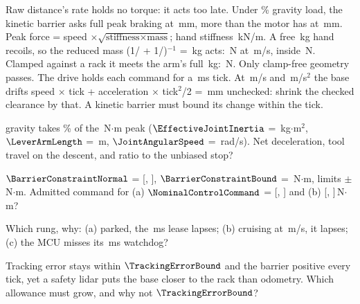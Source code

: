 \documentclass{studysheet}
\begin{document}
\begin{rightcol}
%
  {Raw distance's rate holds no torque: it acts too late. Under \% gravity load,
   the kinetic barrier asks full peak braking at \,mm, more than the motor has at \,mm.}{}
%
  {Peak force = speed $\times\sqrt{\text{stiffness}\times\text{mass}}$; hand stiffness \,kN/m. A free
   \,kg hand recoils, so the reduced mass (1/ + 1/)$^{-1}$ = \,kg acts: \,N at
   \,m/s, inside \,N. Clamped against a rack it meets the arm's full \,kg: \,N.
   Only clamp-free geometry passes.}{}
%
  {The drive holds each command for a \,ms tick. At \,m/s and \,m/s$^2$ the base drifts
   speed $\times$ tick + acceleration $\times$ tick$^2$/2 = \,mm unchecked: shrink the checked clearance by that.
   A kinetic barrier must bound its change within the tick.}{}

\vspace{2pt}
\begin{qs}
\item \assumed{} gravity takes \% of the \,N$\cdot$m peak ($\EffectiveJointInertia$ = \,kg$\cdot$m$^2$,
  $\LeverArmLength$ = \,m, $\JointAngularSpeed$ = \,rad/s). Net deceleration, tool travel on the descent,
  and ratio to the unbiased stop?
\item \assumed{} $\BarrierConstraintNormal$ = [, ], $\BarrierConstraintBound$ = \,N$\cdot$m, limits $\pm$\,N$\cdot$m. Admitted command
  for (a) $\NominalControlCommand$ = [, ] and (b) [, ]\,N$\cdot$m?
\item Which rung, why: (a) parked, the \,ms lease lapses; (b) cruising at
  \,m/s, it lapses; (c) the MCU misses its \,ms watchdog?
\item Tracking error stays within $\TrackingErrorBound$ and the barrier positive every tick, yet a safety
  lidar puts the base closer to the rack than odometry. Which allowance must grow, and why not $\TrackingErrorBound$?
\end{qs}
\end{rightcol}
\end{document}
